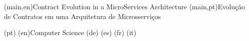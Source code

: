 
%


\nttitle(main,en){Contract Evolution in a MicroServices Architecture}%
\nttitle(main,pt){Evolução de Contratos em uma Arquitetura de Microsserviços}%



\ntdegreename(pt){}
\ntdegreename(en){Computer Science}
\ntdegreename(de){}
\ntdegreename(es){}
\ntdegreename(fr){}
\ntdegreename(it){}

